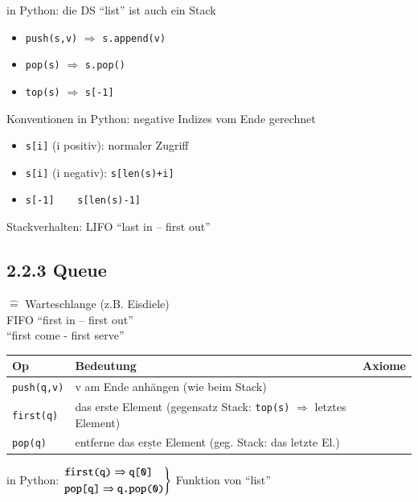 \documentclass[11pt, fleqn]{scrreprt}
\begin{document}
    in Python: die DS ``list'' ist auch ein Stack
    \begin{itemize}
        \item \verb|push(s,v)| $\Rightarrow$ \verb|s.append(v)|
        \item \verb|pop(s)| $\Rightarrow$ \verb|s.pop()|
        \item \verb|top(s)| $\Rightarrow$ \verb|s[-1]|
    \end{itemize}
    Konventionen in Python: negative Indizes vom Ende gerechnet
    \begin{itemize}[label={}]
        \item \verb|s[i]| (i positiv): normaler Zugriff
        \item \verb|s[i]| (i negativ): \verb|s[len(s)+i]|
        \item \verb|s[-1]    s[len(s)-1]|
    \end{itemize}

    Stackverhalten: LIFO ``last in – first out''

    \subsection*{2.2.3 Queue}
    $\widehat{=}$ Warteschlange (z.B. Eisdiele) \\

    FIFO ``first in – first out'' \\
    ``first come - first serve'' \\

    \begin{tabular}{C{5cm} C{5cm} C{5cm}}
        Op & Bedeutung & Axiome \\ \hline
        \verb|push(q,v)| & v am Ende anhängen (wie beim Stack) & \\
        \verb|first(q)| & das erste Element (gegensatz Stack: \verb|top(s)| $\Rightarrow$ letztes Element) & \\
        \verb|pop(q)| & entferne das $\underline{\text{erste}}$ Element (geg. Stack: das letzte El.) & \\ \hline
    \end{tabular}

    in Python:
    $\begin{rcases}
        \verb|first(q)| \Rightarrow \verb|q[0]| \\
        \verb|pop[q]| \Rightarrow \verb|q.pop(0)|
        \end{rcases}$
        Funktion von ``list'' \\
\end{document}
